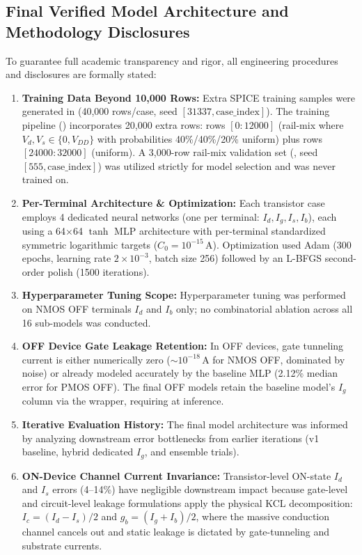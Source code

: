 \documentclass[11pt,a4paper]{article}
\numberwithin{table}{section}
\numberwithin{figure}{section}
\begin{document}
\subsection{Final Verified Model Architecture and Methodology Disclosures}
To guarantee full academic transparency and rigor, all engineering procedures and disclosures are formally stated:
\begin{enumerate}[itemsep=0.2em,leftmargin=1.5em]
    \item \textbf{Training Data Beyond 10,000 Rows:} Extra SPICE training samples were generated in  (40,000 rows/case, seed $[31337, \mathrm{case\_index}]$). The training pipeline () incorporates 20,000 extra rows: rows $[0:12000]$ (rail-mix where $V_d, V_s \in \{0, V_{DD}\}$ with probabilities 40\%/40\%/20\% uniform) plus rows $[24000:32000]$ (uniform). A 3,000-row rail-mix validation set (, seed $[555, \mathrm{case\_index}]$) was utilized strictly for model selection and was never trained on.
    \item \textbf{Per-Terminal Architecture \& Optimization:} Each transistor case employs 4 dedicated neural networks (one per terminal: $I_d, I_g, I_s, I_b$), each using a 64$\times$64 $\tanh$ MLP architecture with per-terminal standardized symmetric logarithmic targets ($C_0 = 10^{-15}\,\mathrm{A}$). Optimization used Adam (300 epochs, learning rate $2\times 10^{-3}$, batch size 256) followed by an L-BFGS second-order polish (1500 iterations).
    \item \textbf{Hyperparameter Tuning Scope:} Hyperparameter tuning was performed on NMOS OFF terminals $I_d$ and $I_b$ only; no combinatorial ablation across all 16 sub-models was conducted.
    \item \textbf{OFF Device Gate Leakage Retention:} In OFF devices, gate tunneling current is either numerically zero ($\sim 10^{-18}\,\mathrm{A}$ for NMOS OFF, dominated by noise) or already modeled accurately by the baseline MLP (2.12\% median error for PMOS OFF). The final OFF models retain the baseline model's $I_g$ column via the  wrapper, requiring  at inference.
    \item \textbf{Iterative Evaluation History:} The final model architecture was informed by analyzing downstream error bottlenecks from earlier iterations (v1 baseline, hybrid dedicated $I_g$, and ensemble trials).
    \item \textbf{ON-Device Channel Current Invariance:} Transistor-level ON-state $I_d$ and $I_s$ errors (4--14\%) have negligible downstream impact because gate-level and circuit-level leakage formulations apply the physical KCL decomposition: $I_c = (I_d - I_s)/2$ and $g_b = (I_g + I_b)/2$, where the massive conduction channel cancels out and static leakage is dictated by gate-tunneling and substrate currents.

\end{enumerate}
\end{document}

